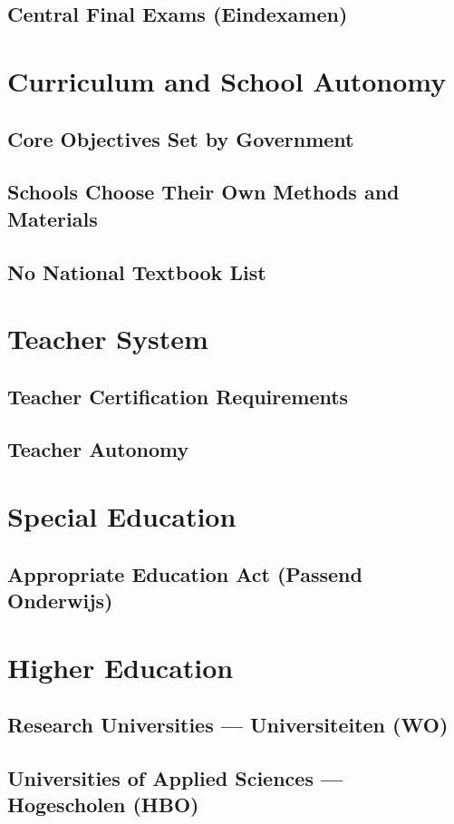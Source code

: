 \subsection{Central Final Exams (Eindexamen)}

\section{Curriculum and School Autonomy}
\subsection{Core Objectives Set by Government}
\subsection{Schools Choose Their Own Methods and Materials}
\subsection{No National Textbook List}

\section{Teacher System}
\subsection{Teacher Certification Requirements}
\subsection{Teacher Autonomy}

\section{Special Education}
\subsection{Appropriate Education Act (Passend Onderwijs)}

\section{Higher Education}
\subsection{Research Universities --- Universiteiten (WO)}
\subsection{Universities of Applied Sciences --- Hogescholen (HBO)}
